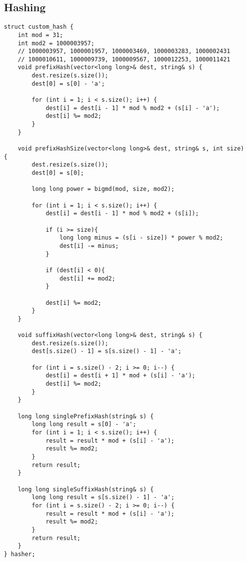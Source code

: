 \subsection{Hashing}
\begin{lstlisting}
struct custom_hash {
    int mod = 31;
    int mod2 = 1000003957;
    // 1000003957, 1000001957, 1000003469, 1000003283, 1000002431
    // 1000010611, 1000009739, 1000009567, 1000012253, 1000011421
    void prefixHash(vector<long long>& dest, string& s) {
        dest.resize(s.size());
        dest[0] = s[0] - 'a';

        for (int i = 1; i < s.size(); i++) {
            dest[i] = dest[i - 1] * mod % mod2 + (s[i] - 'a');
            dest[i] %= mod2;
        }
    }

    void prefixHashSize(vector<long long>& dest, string& s, int size) {
        dest.resize(s.size());
        dest[0] = s[0];

        long long power = bigmd(mod, size, mod2);

        for (int i = 1; i < s.size(); i++) {
            dest[i] = dest[i - 1] * mod % mod2 + (s[i]);
            
            if (i >= size){
                long long minus = (s[i - size]) * power % mod2;
                dest[i] -= minus;
            }

            if (dest[i] < 0){
                dest[i] += mod2;
            }
            
            dest[i] %= mod2;
        }
    }

    void suffixHash(vector<long long>& dest, string& s) {
        dest.resize(s.size());
        dest[s.size() - 1] = s[s.size() - 1] - 'a';
        
        for (int i = s.size() - 2; i >= 0; i--) {
            dest[i] = dest[i + 1] * mod + (s[i] - 'a');
            dest[i] %= mod2;
        }
    }

    long long singlePrefixHash(string& s) {
        long long result = s[0] - 'a';
        for (int i = 1; i < s.size(); i++) {
            result = result * mod + (s[i] - 'a');
            result %= mod2;
        }
        return result;
    }

    long long singleSuffixHash(string& s) {
        long long result = s[s.size() - 1] - 'a';
        for (int i = s.size() - 2; i >= 0; i--) {
            result = result * mod + (s[i] - 'a');
            result %= mod2;
        }
        return result;
    }
} hasher;
\end{lstlisting}